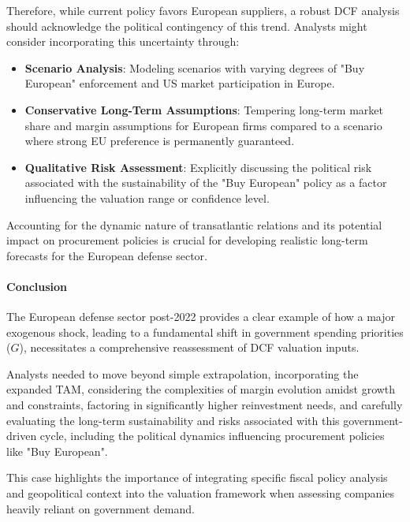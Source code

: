 Therefore, while current policy favors European suppliers, a robust DCF analysis should acknowledge the political contingency of this trend. Analysts might consider incorporating this uncertainty through:
\begin{itemize}
    \item \textbf{Scenario Analysis}: Modeling scenarios with varying degrees of "Buy European" enforcement and US market participation in Europe.
    \item \textbf{Conservative Long-Term Assumptions}: Tempering long-term market share and margin assumptions for European firms compared to a scenario where strong EU preference is permanently guaranteed.
    \item \textbf{Qualitative Risk Assessment}: Explicitly discussing the political risk associated with the sustainability of the "Buy European" policy as a factor influencing the valuation range or confidence level.
\end{itemize}
Accounting for the dynamic nature of transatlantic relations and its potential impact on procurement policies is crucial for developing realistic long-term forecasts for the European defense sector.

\paragraph{Conclusion}
The European defense sector post-2022 provides a clear example of how a major exogenous shock, leading to a fundamental shift in government spending priorities (\(G\)), necessitates a comprehensive reassessment of DCF valuation inputs.

Analysts needed to move beyond simple extrapolation, incorporating the expanded TAM, considering the complexities of margin evolution amidst growth and constraints, factoring in significantly higher reinvestment needs, and carefully evaluating the long-term sustainability and risks associated with this government-driven cycle, including the political dynamics influencing procurement policies like "Buy European".

This case highlights the importance of integrating specific fiscal policy analysis and geopolitical context into the valuation framework when assessing companies heavily reliant on government demand.
